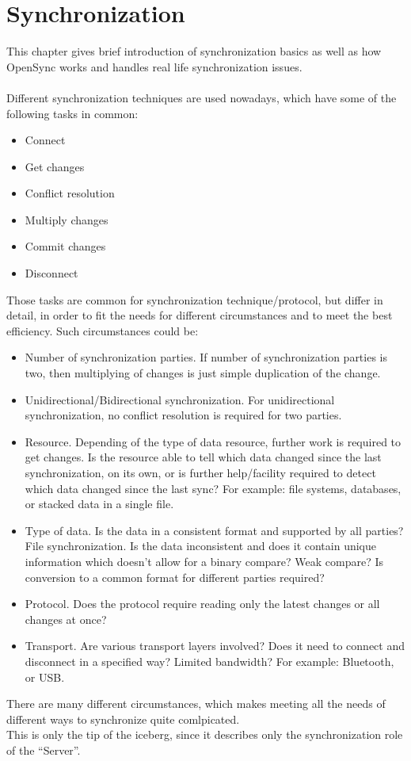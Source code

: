 \chapter{Synchronization}
This chapter gives brief introduction of synchronization basics as well as how
OpenSync works and handles real life synchronization issues.\\
\\
Different synchronization techniques are used nowadays, which have some of the
following tasks in common:
\begin{itemize}
 \item Connect
 \item Get changes
 \item Conflict resolution
 \item Multiply changes
 \item Commit changes
 \item Disconnect
\end{itemize}
Those tasks are common for synchronization technique/protocol, but differ in
detail, in order to fit the needs for different circumstances and to meet the 
best efficiency. Such circumstances could be:
\begin{itemize}
 \item Number of synchronization parties. If number of synchronization
 parties is two, then multiplying of changes is just simple duplication of the
 change.
 \item Unidirectional/Bidirectional synchronization. For unidirectional
 synchronization, no conflict resolution is required for two parties.
 \item Resource. Depending of the type of data resource, further work is required
 to get changes. Is the resource able to tell which data changed since the last
 synchronization, on its own, or is further help/facility required to detect
 which data changed since the last sync? For example: file systems, databases,
 or stacked data in a single file.
 \item Type of data. Is the data in a consistent format and supported by all
 parties? File synchronization. Is the data inconsistent and does it contain unique
 information which doesn't allow for a binary compare? Weak compare? Is 
 conversion to a common format for different parties required?
 \item Protocol. Does the protocol require reading only the latest changes or 
 all changes at once?
 \item Transport. Are various transport layers involved? Does it need to
 connect and disconnect in a specified way? Limited bandwidth? For example: 
 Bluetooth, or USB.
\end{itemize}
There are many different circumstances, which makes meeting all the needs of different
ways to synchronize quite comlpicated.\\
This is only the tip of the iceberg, since it describes only the
synchronization role of the ``Server''. 

